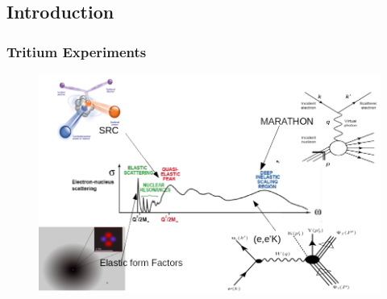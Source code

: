 \documentclass[12pt]{beamer}
\begin{document}
\subsection[Introduction]{Introduction}

\begin{frame}
\frametitle{Tritium Experiments}
\vspace*{-25pt}
\begin{figure}
	\includegraphics[width =12cm]{../images/tritium_ov}
\end{figure}
\end{frame}
\end{document}
